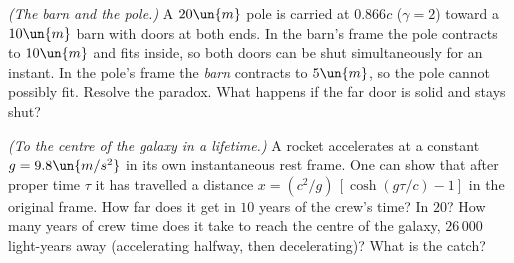 \begin{problems}
 \emph{(The barn and the pole.)} A $20\un{m}$ pole is carried at $0.866c$ ($\gamma = 2$) toward a $10\un{m}$ barn with doors at both ends. In the barn's frame the pole contracts to $10\un{m}$ and fits inside, so both doors can be shut simultaneously for an instant. In the pole's frame the \emph{barn} contracts to $5\un{m}$, so the pole cannot possibly fit. Resolve the paradox. What happens if the far door is solid and stays shut?

 \emph{(To the centre of the galaxy in a lifetime.)} A rocket accelerates at a constant $g = 9.8\un{m/s^2}$ in its own instantaneous rest frame. One can show that after proper time $\tau$ it has travelled a distance $x = (c^2/g)\,[\cosh(g\tau/c) - 1]$ in the original frame. How far does it get in $10$ years of the crew's time? In $20$? How many years of crew time does it take to reach the centre of the galaxy, $26\,000$ light-years away (accelerating halfway, then decelerating)? What is the catch?
\end{problems}

\begin{reading}
\end{reading}
